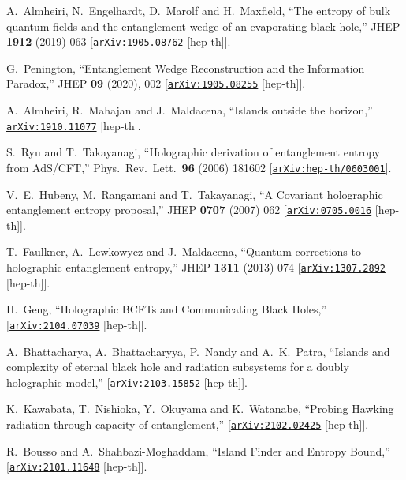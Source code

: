 \documentclass[12pt]{article}
\newcommand \arXiv [1]{\href{http://arxiv.org/abs/#1}{\tt arXiv:#1}}
\begin{document}
\begin{thebibliography}{99}
{%
  A.~Almheiri, N.~Engelhardt, D.~Marolf and H.~Maxfield,
  ``The entropy of bulk quantum fields and the entanglement wedge of an evaporating black hole,''
  JHEP {\bf 1912} (2019) 063
  [\arXiv{1905.08762} [hep-th]].

G.~Penington,
``Entanglement Wedge Reconstruction and the Information Paradox,''
JHEP \textbf{09} (2020), 002
[\arXiv{1905.08255} [hep-th]].

  A.~Almheiri, R.~Mahajan and J.~Maldacena,
  ``Islands outside the horizon,''
  \arXiv{1910.11077} [hep-th].  
  
  S.~Ryu and T.~Takayanagi,
  ``Holographic derivation of entanglement entropy from AdS/CFT,''
  Phys.\ Rev.\ Lett.\  {\bf 96} (2006) 181602
  [\arXiv{hep-th/0603001}].
 
 
  V.~E.~Hubeny, M.~Rangamani and T.~Takayanagi,
  ``A Covariant holographic entanglement entropy proposal,''
  JHEP {\bf 0707} (2007) 062
  [\arXiv{0705.0016} [hep-th]]. 

  T.~Faulkner, A.~Lewkowycz and J.~Maldacena,
  ``Quantum corrections to holographic entanglement entropy,''
  JHEP {\bf 1311} (2013) 074
  [\arXiv{1307.2892} [hep-th]].






H.~Geng,
``Holographic BCFTs and Communicating Black Holes,''
[\arXiv{2104.07039} [hep-th]].

A.~Bhattacharya, A.~Bhattacharyya, P.~Nandy and A.~K.~Patra,
``Islands and complexity of eternal black hole and radiation subsystems for a doubly holographic model,''
[\arXiv{2103.15852} [hep-th]].

K.~Kawabata, T.~Nishioka, Y.~Okuyama and K.~Watanabe,
``Probing Hawking radiation through capacity of entanglement,''
[\arXiv{2102.02425} [hep-th]].

R.~Bousso and A.~Shahbazi-Moghaddam,
``Island Finder and Entropy Bound,''
[\arXiv{2101.11648} [hep-th]].

}
\end{thebibliography}
\end{document}
